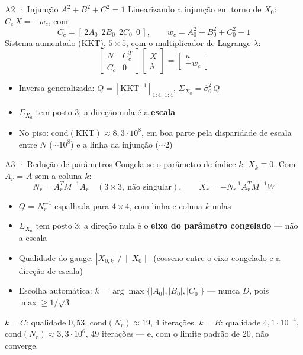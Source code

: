 \documentclass[aspectratio=169,11pt]{beamer}
\begin{document}
\begin{frame}{A2 · Injunção $A^2 + B^2 + C^2 = 1$}
  \small
  Linearizando a injunção em torno de $X_0$: \; $C_c\, X = -w_c$, com
  \[ C_c = [\,2A_0\ \ 2B_0\ \ 2C_0\ \ 0\,], \qquad w_c = A_0^2 + B_0^2 + C_0^2 - 1 \]
  Sistema aumentado (KKT), $5\times5$, com o multiplicador de Lagrange $\lambda$:
  \[
    \begin{bmatrix} N & C_c^T \\ C_c & 0 \end{bmatrix}
    \begin{bmatrix} X \\ \lambda \end{bmatrix}
    =
    \begin{bmatrix} u \\ -w_c \end{bmatrix}
  \]
  \begin{itemize}
    \item Inversa generalizada: $Q = \left[\mathrm{KKT}^{-1}\right]_{1:4,\,1:4}$, \quad
          $\Sigma_{X_a} = \hat\sigma_0^2\, Q$
    \item $\Sigma_{X_a}$ tem posto 3; a direção nula é a \textbf{escala}
    \item No piso: $\mathrm{cond}(\mathrm{KKT}) \approx 8{,}3\cdot10^{8}$, em boa parte pela
          disparidade de escala entre $N$ ($\sim10^{8}$) e a linha da injunção ($\sim2$)
  \end{itemize}
\end{frame}

\begin{frame}{A3 · Redução de parâmetros}
  \small
  Congela-se o parâmetro de índice $k$: $X_k \equiv 0$. Com
  $A_r$ = $A$ sem a coluna $k$:
  \[ N_r = A_r^T M^{-1} A_r \quad (3\times3,\ \text{não singular}), \qquad
     X_r = -N_r^{-1} A_r^T M^{-1} W \]
  \begin{itemize}
    \item $Q$ = $N_r^{-1}$ espalhada para $4\times4$, com linha e coluna $k$ nulas
    \item $\Sigma_{X_a}$ tem posto 3; a direção nula é o \textbf{eixo do parâmetro congelado}
          --- não a escala
    \item Qualidade do gauge: $|X_{0,k}| \,/\, \lVert X_0 \rVert$ (cosseno entre o eixo
          congelado e a direção de escala)
    \item Escolha automática: $k = \arg\max \{|A_0|, |B_0|, |C_0|\}$ --- nunca $D$, pois
          $\max \ge 1/\sqrt3$
  \end{itemize}
  \begin{cuidado}[title={No piso}]
    $k = C$: qualidade $0{,}53$, $\mathrm{cond}(N_r) \approx 19$, 4 iterações.
    $k = B$: qualidade $4{,}1\cdot10^{-4}$, $\mathrm{cond}(N_r) \approx 3{,}3\cdot10^{6}$,
    49 iterações --- e, com o limite padrão de 20, \alert{não converge}.
  \end{cuidado}
\end{frame}
\end{document}
